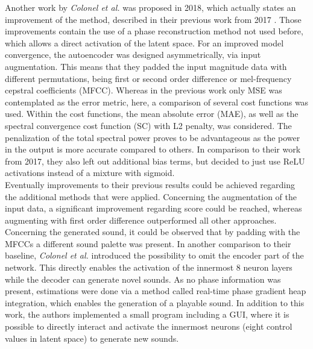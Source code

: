 Another work by \textit{Colonel et al.} was proposed in 2018, which actually states an improvement of the method, described in their previous work from 2017 \cite{colonel2018autoencoding}. Those improvements contain the use of a phase reconstruction method not used before, which allows a direct activation of the latent space. For an improved model convergence, the autoencoder was designed asymmetrically, via input augmentation. This means that they padded the input magnitude data with different permutations, being first or second order difference or mel-frequency cepstral coefficients (MFCC). Whereas in the previous work only MSE was contemplated as the error metric, here, a comparison of several cost functions was used. Within the cost functions, the mean absolute error (MAE), as well as the spectral convergence cost function (SC) with L2 penalty, was considered. The penalization of the total spectral power proves to be advantageous as the power in the output is more accurate compared to others. In comparison to their work from 2017, they also left out additional bias terms, but decided to just use ReLU activations instead of a mixture with sigmoid.\\
Eventually improvements to their previous results could be achieved regarding the additional methods that were applied. Concerning the augmentation of the input data, a significant improvement regarding score could be reached, whereas augmenting with first order difference outperformed all other approaches. Concerning the generated sound, it could be observed that by padding with the MFCCs a different sound palette was present. In another comparison to their baseline, \textit{Colonel et al.} introduced the possibility to omit the encoder part of the network. This directly enables the activation of the innermost 8 neuron layers while the decoder can generate novel sounds. As no phase information was present, estimations were done via a method called real-time phase gradient heap integration, which enables the generation of a playable sound. In addition to this work, the authors implemented a small program including a GUI, where it is possible to directly interact and activate the innermost neurons (eight control values in latent space) to generate new sounds.

